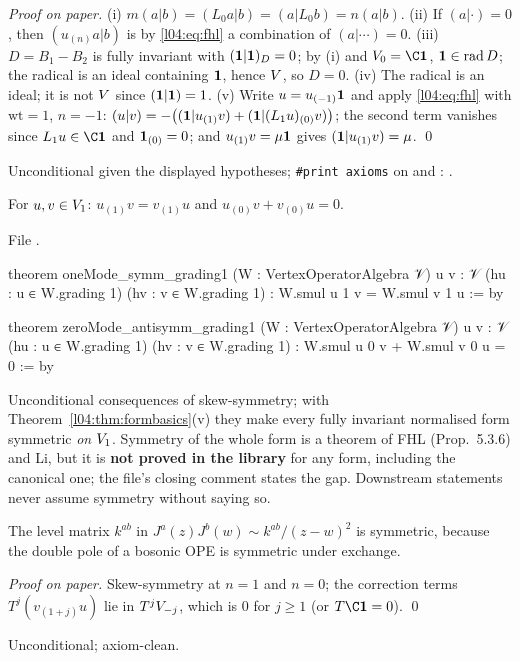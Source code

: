 \emph{Proof on paper.} (i) $m(a|b) = (L_0a|b) = (a|L_0b) = n(a|b)$. (ii) If $(a|\cdot) = 0$, then
$(u_{(n)}a|b)$ is by \eqref{l04:eq:fhl} a combination of $(a|\cdots) = 0$. (iii) $D = B_1-B_2$ is fully
invariant with $(\mathbf{1}|\mathbf{1})_D = 0$; by (i) and $\lfourV_0 = \C\lfourvac$, $\mathbf{1}\in\operatorname{rad} D$; the
radical is an ideal containing $\mathbf{1}$, hence $V$, so $D = 0$. (iv) The radical is an ideal; it is
not $V$ since $(\mathbf{1}|\mathbf{1}) = 1$. (v) Write $u = u_{(-1)}\mathbf{1}$ and apply \eqref{l04:eq:fhl} with
$\mathrm{wt} = 1$, $n = -1$: $(u|v) = -\big((\mathbf{1}|u_{(1)}v) + (\mathbf{1}|(L_1u)_{(0)}v)\big)$; the second
term vanishes since $L_1u\in\C\lfourvac$ and $\mathbf{1}_{(0)} = 0$; and $u_{(1)}v = \mu\mathbf{1}$ gives
$(\mathbf{1}|u_{(1)}v) = \mu$. \qed
\begin{status}
Unconditional given the displayed hypotheses; \texttt{\#print axioms} on  and
\allowbreak{}: .
\end{status}

\begin{theorem}\label{l04:thm:v1symm}
For $u,v\in V_1$: $u_{(1)}v = v_{(1)}u$ and $u_{(0)}v+v_{(0)}u = 0$.
\end{theorem}
\noindent File .
\begin{leancode}
theorem oneMode_symm_grading1 (W : VertexOperatorAlgebra 𝒱) {u v : 𝒱}
    (hu : u ∈ W.grading 1) (hv : v ∈ W.grading 1) :
    W.smul u 1 v = W.smul v 1 u := by

theorem zeroMode_antisymm_grading1 (W : VertexOperatorAlgebra 𝒱) {u v : 𝒱}
    (hu : u ∈ W.grading 1) (hv : v ∈ W.grading 1) :
    W.smul u 0 v + W.smul v 0 u = 0 := by
\end{leancode}
\begin{dictionary}
Unconditional consequences of skew-symmetry; with Theorem~\ref{l04:thm:formbasics}(v) they make every
fully invariant normalised form symmetric \emph{on $V_1$}. Symmetry of the whole form is a theorem
of FHL (Prop.~5.3.6) and Li, but it is \textbf{not proved in the library} for any form, including the
canonical one; the file's closing comment states the gap. Downstream statements never assume symmetry
without saying so.
\end{dictionary}
\begin{physics}
The level matrix $k^{ab}$ in $J^a(z)J^b(w)\sim k^{ab}/(z-w)^2$ is symmetric, because the double pole of a
bosonic OPE is symmetric under exchange.
\end{physics}
\emph{Proof on paper.} Skew-symmetry at $n = 1$ and $n = 0$; the correction terms $T^j(v_{(1+j)}u)$ lie in
$T^jV_{-j}$, which is $0$ for $j\ge1$ (or $T\C\lfourvac = 0$). \qed
\begin{status}
Unconditional; axiom-clean.
\end{status}

